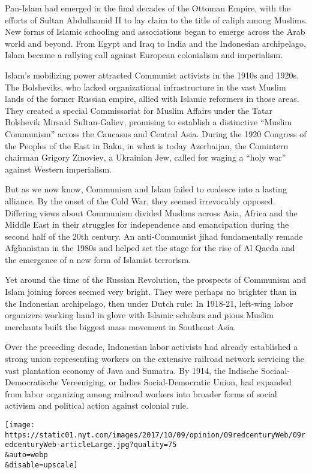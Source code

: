 Pan-Islam had emerged in the final decades of the Ottoman Empire, with
the efforts of Sultan Abdulhamid II to lay claim to the title of caliph
among Muslims. New forms of Islamic schooling and associations began to
emerge across the Arab world and beyond. From Egypt and Iraq to India
and the Indonesian archipelago, Islam became a rallying call against
European colonialism and imperialism.

Islam's mobilizing power attracted Communist activists in the 1910s and
1920s. The Bolsheviks, who lacked organizational infrastructure in the
vast Muslim lands of the former Russian empire, allied with Islamic
reformers in those areas. They created a special Commissariat for Muslim
Affairs under the Tatar Bolshevik Mirsaid Sultan-Galiev, promising to
establish a distinctive ``Muslim Communism'' across the Caucasus and
Central Asia. During the 1920 Congress of the Peoples of the East in
Baku, in what is today Azerbaijan, the Comintern chairman Grigory
Zinoviev, a Ukrainian Jew, called for waging a ``holy war'' against
Western imperialism.

But as we now know, Communism and Islam failed to coalesce into a
lasting alliance. By the onset of the Cold War, they seemed irrevocably
opposed. Differing views about Communism divided Muslims across Asia,
Africa and the Middle East in their struggles for independence and
emancipation during the second half of the 20th century. An
anti-Communist jihad fundamentally remade Afghanistan in the 1980s and
helped set the stage for the rise of Al Qaeda and the emergence of a new
form of Islamist terrorism.

Yet around the time of the Russian Revolution, the prospects of
Communism and Islam joining forces seemed very bright. They were perhaps
no brighter than in the Indonesian archipelago, then under Dutch rule:
In 1918-21, left-wing labor organizers working hand in glove with
Islamic scholars and pious Muslim merchants built the biggest mass
movement in Southeast Asia.

Over the preceding decade, Indonesian labor activists had already
established a strong union representing workers on the extensive
railroad network servicing the vast plantation economy of Java and
Sumatra. By 1914, the Indische Sociaal-Democratische Vereeniging, or
Indies Social-Democratic Union, had expanded from labor organizing among
railroad workers into broader forms of social activism and political
action against colonial rule.

\texttt{[image: https://static01.nyt.com/images/2017/10/09/opinion/09redcenturyWeb/09redcenturyWeb-articleLarge.jpg?quality=75\\\&auto=webp\\\&disable=upscale]}

